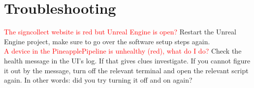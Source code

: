 \section{Troubleshooting}
\textcolor{red}{The signcollect website is red but Unreal Engine is open?} Restart the Unreal Engine project, make sure to go over the software setup steps again.\\
\textcolor{red}{A device in the PineapplePipeline is unhealthy (red), what do I do?} Check the health message in the UI's log. If that gives clues investigate. If you cannot figure it out by the message, turn off the relevant terminal and open the relevant script again. In other words: did you try turning it off and on again?
